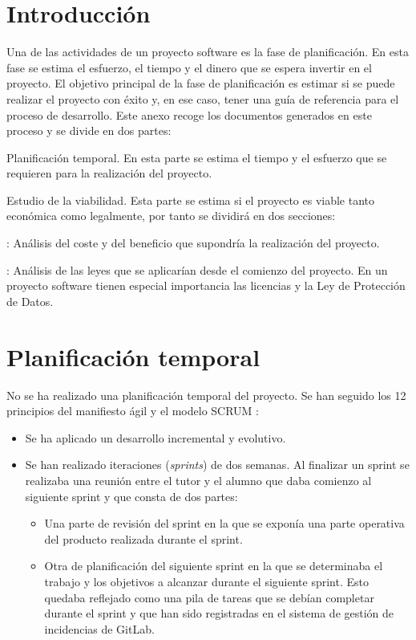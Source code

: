 \label{anex:A}

\section{Introducción}
Una de las actividades de un proyecto software es la fase de planificación. En esta fase se estima el esfuerzo, el tiempo y el dinero que se espera invertir en el proyecto. El objetivo principal de la fase de planificación es estimar si se puede realizar el proyecto con éxito y, en ese caso, tener una guía de referencia para el proceso de desarrollo. Este anexo recoge los documentos generados en este proceso y se divide en dos partes:
\begin{description}
	\tightlist
	\item Planificación temporal. En esta parte se estima el tiempo y el esfuerzo que se requieren para la realización del proyecto.
	\item Estudio de la viabilidad. Esta parte se estima si el proyecto es viable tanto económica como legalmente, por tanto se dividirá en dos secciones:
	\begin{description}
		\tightlist
		\item[Viabilidad económica]: Análisis del coste y del beneficio que supondría la realización del proyecto.
		\item[Viabilidad legal]: Análisis de las leyes que se aplicarían desde el comienzo del proyecto. En un proyecto software tienen especial importancia las licencias y la Ley de Protección de Datos.
	\end{description}
\end{description}

\section{Planificación temporal}
No se ha realizado una planificación temporal del proyecto. Se han seguido los 12 principios del manifiesto ágil y el modelo SCRUM \cite{noauthor_scrum_2019}:
\begin{itemize}
	\tightlist
	\item Se ha aplicado un desarrollo incremental y evolutivo.
	\item Se han realizado iteraciones (\textit{sprints}) de dos semanas. Al finalizar un sprint se realizaba una reunión entre el tutor y el alumno que daba comienzo al siguiente sprint y que consta de dos partes:
	\begin{itemize}
		\item Una parte de revisión del sprint en la que se exponía una parte operativa del producto realizada durante el sprint.
		\item Otra de planificación del siguiente sprint en la que se determinaba el trabajo y los objetivos a alcanzar durante el siguiente sprint. Esto quedaba reflejado como una pila de tareas que se debían completar durante el sprint y que han sido registradas en el sistema de gestión de incidencias de GitLab.
	\end{itemize}
\end{itemize}
